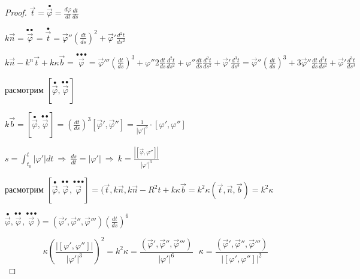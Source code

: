 \begin{proof}
  $
  \vec t = \stackrel{\bullet}{\vec \varphi} = \frac{d\varphi}{dt}
  \frac{dt}{ds}
  $

  $
  k \vec n = \stackrel{\bullet \bullet}{\vec \varphi} =
  \stackrel{\bullet}{\vec t} = \vec \varphi'' (\frac{dt}{ds})^2 +
  \vec \varphi' \frac{d^2t}{ds^2}
  $

  $
  k \vec n - k^n \vec t + k \kappa \vec b =
  \stackrel{\bullet \bullet \bullet}{\vec \varphi} = \vec \varphi'''
  (\frac{dt}{ds})^3 + \varphi'' 2 \frac{dt}{ds} \frac{d^2 t}{ds^2} +
  \varphi'' \frac{dt}{ds} \frac{d^2 t}{ds^2} + \vec \varphi'
  \frac{d^3 t}{ds^3} = \vec \varphi'' (\frac{dt}{ds})^3 + 3 \vec \varphi''
  \frac{dt}{ds}\frac{d^2t}{ds^2} + \vec \varphi' \frac{d^3t}{ds^3}
  $

  расмотрим $[\stackrel{\bullet}{\vec \varphi},
  \stackrel{\bullet \bullet}{\vec \varphi}]$

  $
  k \vec b = [\stackrel{\bullet}{\vec \varphi},
  \stackrel{\bullet \bullet}{\vec \varphi}] = (\frac{dt}{ds})^3
  [\vec \varphi', \vec \varphi''] = \frac{1}{|\varphi'|^3} \cdot
  [\varphi', \varphi'']
  $

  $
  s = \int_{t_0}^t |\varphi'|dt ~ \Rightarrow ~ \frac{ds}{dt} =
  |\varphi'| ~ \Rightarrow ~
  k = \frac{|[\vec \varphi, \varphi'']|}{|\varphi'|^3}
  $


  расмотрим
  $
  [\stackrel{\bullet}{\vec \varphi},
  \stackrel{\bullet \bullet}{\vec \varphi},
  \stackrel{\bullet \bullet \bullet}{\vec \varphi}] = (\vec t, k \vec n,
  k \vec n - R^2t + k \kappa \vec b = k^2 \kappa(\vec t, \vec n, \vec b) =
  k^2 \kappa
  $

  $
  \stackrel{\bullet}{\vec \varphi},
  \stackrel{\bullet \bullet}{\vec \varphi},
  \stackrel{\bullet \bullet \bullet}{\vec \varphi}) =
  (\vec \varphi', \vec \varphi'', \vec \varphi''') (\frac{dt}{ds})^6
  $

  $$
  \kappa (\frac{|[\varphi', \varphi'']|}{|\varphi'|^3})^2 =
  k^2 \kappa =
  \frac{(\vec \varphi', \vec \varphi'', \vec \varphi''')}{|\varphi'|^6} ~~~
  \kappa =
  \frac{(\vec \varphi', \vec \varphi'', \vec \varphi''')}{|[\varphi',
  \varphi'']|^2}
  $$
\end{proof}